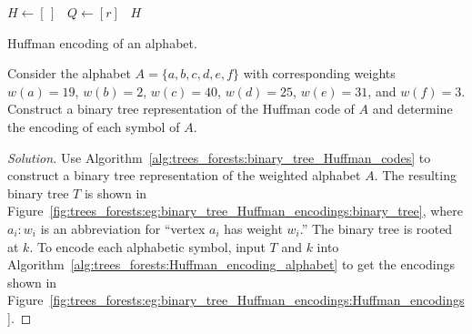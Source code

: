 \begin{algorithm}[!htpb]
\dontprintsemicolon  %
\BlankLine
$H \leftarrow [\,]$~\;
$Q \leftarrow [r]$~\;
\Return $H$\;
\caption{Huffman encoding of an alphabet.}
\label{alg:trees_forests:Huffman_encoding_alphabet}
\end{algorithm}

\begin{example}
Consider the alphabet $A = \{a, b, c, d, e, f\}$ with corresponding
weights $w(a) = 19$, $w(b) = 2$, $w(c) = 40$, $w(d) = 25$,
$w(e) = 31$, and $w(f) = 3$. Construct a binary tree representation of
the Huffman code of $A$ and determine the encoding of each symbol of
$A$.
\end{example}

\begin{proof}[Solution]
Use Algorithm~\ref{alg:trees_forests:binary_tree_Huffman_codes} to
construct a binary tree representation of the weighted alphabet
$A$. The resulting binary tree $T$ is shown in
Figure~\ref{fig:trees_forests:eg:binary_tree_Huffman_encodings:binary_tree},
where $a_i: w_i$ is an abbreviation for ``vertex $a_i$ has weight
$w_i$.'' The binary tree is rooted at $k$. To encode each alphabetic
symbol, input $T$ and $k$ into
Algorithm~\ref{alg:trees_forests:Huffman_encoding_alphabet} to get the
encodings shown in
Figure~\ref{fig:trees_forests:eg:binary_tree_Huffman_encodings:Huffman_encodings}.
\end{proof}


